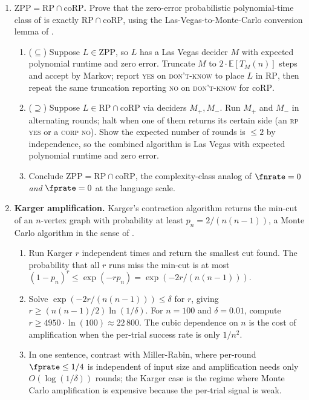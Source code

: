 \begin{enumerate}

\item \exstarstarstar
\label{ex:ch11-9}
\textbf{$\mathrm{ZPP} = \mathrm{RP} \cap \mathrm{coRP}$.}
Prove that the zero-error probabilistic polynomial-time class of
 is exactly $\mathrm{RP} \cap \mathrm{coRP}$, using
the Las-Vegas-to-Monte-Carlo conversion lemma of
.
\begin{enumerate}
  \item[(a)] ($\subseteq$) Suppose $L \in \mathrm{ZPP}$, so $L$
    has a Las Vegas decider $M$ with expected polynomial runtime
    and zero error. Truncate $M$ to $2 \cdot \mathbb{E}[T_M(n)]$
    steps and accept by Markov; report \textsc{yes} on
    \textsc{don't-know} to place $L$ in $\mathrm{RP}$, then
    repeat the same truncation reporting \textsc{no} on
    \textsc{don't-know} for $\mathrm{coRP}$.
  \item[(b)] ($\supseteq$) Suppose $L \in \mathrm{RP} \cap
    \mathrm{coRP}$ via deciders $M_+, M_-$. Run $M_+$ and $M_-$
    in alternating rounds; halt when one of them returns its
    certain side (an \textsc{rp} \textsc{yes} or a \textsc{corp}
    \textsc{no}). Show the expected number of rounds is $\le 2$
    by independence, so the combined algorithm is Las Vegas with
    expected polynomial runtime and zero error.
  \item[(c)] Conclude $\mathrm{ZPP} = \mathrm{RP} \cap
    \mathrm{coRP}$, the complexity-class analog of $\fnrate = 0$
    \emph{and} $\fprate = 0$ at the language scale.
\end{enumerate}

\item \exstarstarstar
\label{ex:ch11-10}
\textbf{Karger amplification.}
Karger's contraction algorithm returns the min-cut of an $n$-vertex
graph with probability at least $p_n = 2 / (n (n - 1))$, a Monte
Carlo algorithm in the sense of .
\begin{enumerate}
  \item[(a)] Run Karger $r$ independent times and return the
    smallest cut found. The probability that all $r$ runs miss the
    min-cut is at most $(1 - p_n)^r \le \exp(-r p_n) = \exp(-2 r /
    (n (n - 1)))$.
  \item[(b)] Solve $\exp(-2 r / (n (n - 1))) \le \delta$ for $r$,
    giving $r \ge (n (n - 1) / 2) \ln(1 / \delta)$. For $n = 100$
    and $\delta = 0.01$, compute $r \ge 4950 \cdot \ln(100)
    \approx 22\,800$. The cubic dependence on $n$ is the cost of
    amplification when the per-trial success rate is only $1 / n^2$.
  \item[(c)] In one sentence, contrast with Miller-Rabin, where
    per-round $\fprate \le 1/4$ is independent of input size and
    amplification needs only $O(\log(1 / \delta))$ rounds; the
    Karger case is the regime where Monte Carlo amplification is
    expensive because the per-trial signal is weak.
\end{enumerate}


\end{enumerate}
